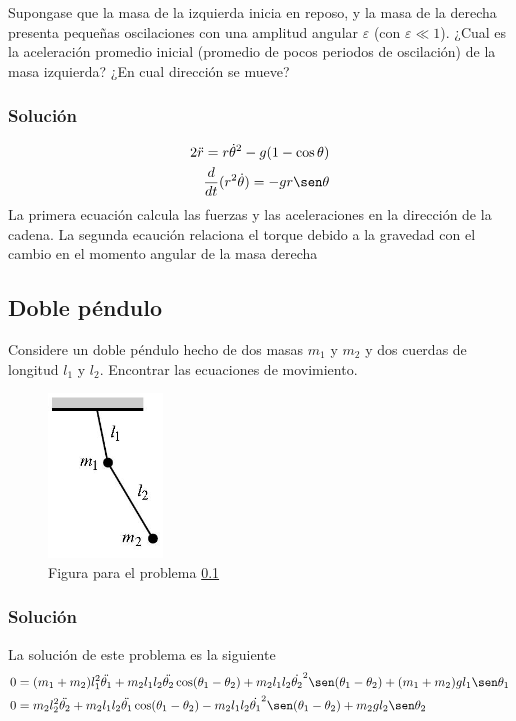 \documentclass[12pt]{book}
\theoremstyle{definition}
\theoremstyle{remark}
\theoremstyle{plain}
\begin{document}
Supongase que la masa de la izquierda inicia en reposo, y la masa de la derecha presenta pequeñas oscilaciones con una amplitud angular $\varepsilon$ (con $\varepsilon \ll 1$). ¿Cual es la aceleración promedio inicial (promedio de pocos periodos de oscilación) de la masa izquierda? ¿En cual dirección se mueve?

\subsubsection{Solución}
\begin{equation*}
\label{equ2}
\begin{aligned}
2 \ddot{r} = r \dot{\theta}^2 -g (1- \cos \theta) \\
\frac{d}{d t}(r^2 \dot{\theta})= -g r \sen \theta
\end{aligned}
\end{equation*}
 La primera ecuación calcula las fuerzas y las aceleraciones en la dirección de la cadena. La segunda ecaución relaciona el torque debido a la gravedad con el cambio en el momento angular de la masa derecha

\subsection{Doble péndulo}
\label{p5}
Considere un doble péndulo hecho de dos masas $m_1$ y $m_2$ y dos cuerdas de longitud $l_1$ y $l_2$. Encontrar las ecuaciones de movimiento.

\begin{figure}
\centering
\includegraphics[width=1.2in]{doblependulo.jpeg}
\caption{Figura para el problema \ref{p5}}
\label{fig5}
\end{figure}

\subsubsection{Solución}
La solución de este problema es la siguiente
\begin{equation*}
\label{equ2}
\begin{aligned}
0 & = (m_1 + m_2) l_1 ^2 \ddot{\theta_1} + m_2 l_1 l_2 \ddot{\theta _2} \cos(\theta _1 - \theta _2) + m_2 l_1 l_2 \dot{\theta _2}^2 \sen (\theta _1 - \theta _2) + (m_1 + m_2) g l_1 \sen \theta _1\\
0 & =  m_2 l_2 ^2 \ddot{\theta_2} + m_2 l_1 l_2 \ddot{\theta _1} \cos(\theta _1 - \theta _2) - m_2 l_1 l_2 \dot{\theta _1}^2 \sen (\theta _1 - \theta _2) +  m_2 g l_2 \sen \theta _2
\end{aligned}
\end{equation*}


\backmatter
\end{document}
